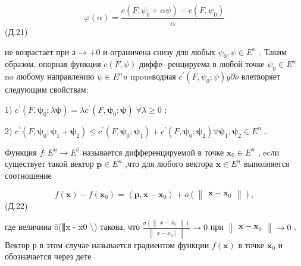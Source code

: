 \documentclass[8pt]{extarticle}
\begin{document}
\[
\varphi \left( \alpha \right)  = \frac{c\left( {F,{\psi }_{0} + {\alpha \psi }}\right)  - c\left( {F,{\psi }_{0}}\right) }{\alpha }
\]
 (Д.21)

не возрастает при а → +0 и ограничена снизу для любых \({\psi }_{0},\psi  \in  {E}^{n}\) . Таким образом, опорная функция \(c\left( {F,\psi }\right)\) диффе- ренцируема в любой точке \({\psi }_{0} \in  {E}^{n}\) no любому направлению \(\psi  \in  {E}^{n}u\) npousводная \({c}^{\prime }\left( {F,{\psi }_{0};\psi }\right) y\partial o\) влетворяет следующим свойствам:

1) \({c}^{\prime }\left( {F,{\mathbf{\psi }}_{0};\lambda \mathbf{\psi }}\right)  = \lambda {c}^{\prime }\left( {F,{\mathbf{\psi }}_{0};\mathbf{\psi }}\right) \;\forall \lambda  \geq  0\) ;

2) \({c}^{\prime }\left( {F,{\mathbf{\psi }}_{0};{\mathbf{\psi }}_{1} + {\mathbf{\psi }}_{2}}\right)  \leq  {c}^{\prime }\left( {F,{\mathbf{\psi }}_{0};{\mathbf{\psi }}_{1}}\right)  + {c}^{\prime }\left( {F,{\mathbf{\psi }}_{0};{\mathbf{\psi }}_{2}}\right) \forall {\mathbf{\psi }}_{1},{\mathbf{\psi }}_{2} \in  {E}^{n}\) .

Функция \(f : {E}^{n} \rightarrow  {E}^{1}\) называется дифференцируемой в точке \({\mathbf{x}}_{0} \in  {E}^{n}\) , ecли существует такой вектор \(\mathbf{p} \in  {E}^{n}\) ,что для любого вектора \(\mathbf{x} \in  {E}^{n}\) выполняется соотношение

\[
f\left( \mathbf{x}\right)  - f\left( {\mathbf{x}}_{0}\right)  = \left\langle  {\mathbf{p},\mathbf{x} - {\mathbf{x}}_{0}}\right\rangle   + \bar{o}\left( \left\lVert \begin{array}{c} {\mathbf{x} - {\mathbf{x}}_{0}} \end{array} \right\rVert\right) ,
\]
 (Д.22)

где величина ō(∥x - x0 \textbackslash  ) такова, что \(\frac{\sigma \left( \left\lVert \begin{array}{c} {x - {x}_{0}} \end{array} \right\rVert\right) }{\left\lVert \begin{array}{c} x - {x}_{0}\left| \right| \end{array} \right\rVert} \rightarrow  0\) при \(\left\lVert \begin{array}{c} {\mathbf{x} - {\mathbf{x}}_{0}} \end{array} \right\rVert \rightarrow  0\) . Вектор р в этом случае называется градиентом функции \(f\left( \mathbf{x}\right)\) в точке \({\mathbf{x}}_{0}\) и обозначается через дете
\end{document}
